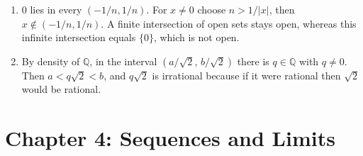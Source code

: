 \begin{enumerate}[label=\textbf{3.\arabic*}]
  \item $0$ lies in every $(-1/n,1/n)$. For $x\ne0$ choose $n>1/|x|$, then
        $x\notin(-1/n,1/n)$. A finite intersection of open sets stays open, whereas
        this infinite intersection equals $\{0\}$, which is not open.

  \item By density of $\mathbb{Q}$, in the interval $(a/\sqrt2,\,b/\sqrt2)$ there is
        $q\in\mathbb{Q}$ with $q\ne0$. Then $a<q\sqrt2<b$, and $q\sqrt2$ is irrational
        because if it were rational then $\sqrt2$ would be rational.
\end{enumerate}

\section*{Chapter 4: Sequences and Limits}
